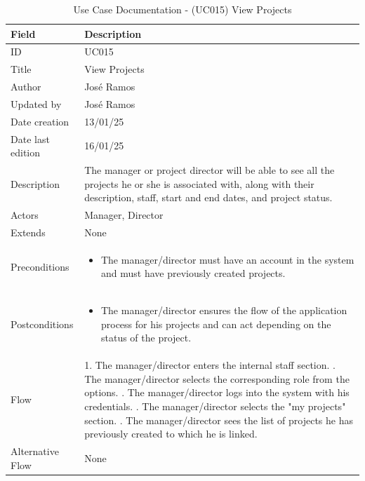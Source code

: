 \documentclass{scrreprt}
\begin{document}
\begin{table}[H]
	\centering
	\begin{tabular}{|p{3cm}|p{10cm}|}
		\hline
		\textbf{Field} & \textbf{Description} \\ \hline
		ID & UC015 \\ \hline
		Title & View Projects \\ \hline
		Author & José Ramos \\ \hline
		Updated by & José Ramos \\ \hline
		Date creation & 13/01/25 \\ \hline
		Date last edition & 16/01/25 \\ \hline
		Description & 
		The manager or project director will be able to see all the projects he or she is associated with, along with their description, staff, start and end dates, and project status. \\ \hline
		Actors & Manager, Director\\ \hline
		Extends & None \\ \hline
		Preconditions & 
		\begin{itemize}
			\item The manager/director must have an account in the system and must have previously created projects.
		\end{itemize} \\ \hline
		Postconditions & 
		\begin{itemize}
			\item The manager/director ensures the flow of the application process for his projects and can act depending on the status of the project.
		\end{itemize} \\ \hline
		Flow & 
		1. The manager/director  enters the internal staff section. \newline
		2. The manager/director  selects the corresponding role from the options. \newline
		3. The manager/director  logs into the system with his credentials. \newline
		4. The manager/director  selects the "my projects" section. \newline
		5. The manager/director  sees the list of projects he has previously created to which he is linked. \\ \hline
		Alternative Flow & 
		None \\ \hline
	\end{tabular}
	\caption{Use Case Documentation - (UC015) View Projects}
	\label{table:UC015}
\end{table}
\end{document}
